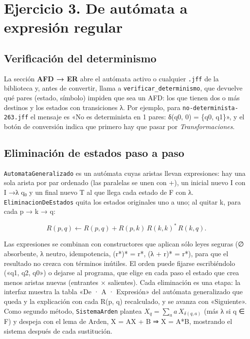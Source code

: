 \hypertarget{ejercicio-3.-de-autuxf3mata-a-expresiuxf3n-regular}{%
\section{Ejercicio 3. De autómata a expresión regular}\label{ejercicio-3.-de-autuxf3mata-a-expresiuxf3n-regular}}

\hypertarget{verificaciuxf3n-del-determinismo}{%
\subsection{Verificación del determinismo}\label{verificaciuxf3n-del-determinismo}}

La sección \textbf{AFD → ER} abre el autómata activo o cualquier \texttt{.jff} de la biblioteca y, antes de convertir, llama a \texttt{verificar\_determinismo}, que devuelve qué pares (estado, símbolo) impiden que sea un AFD: los que tienen dos o más destinos y los estados con transiciones λ. Por ejemplo, para \texttt{no-determinista-263.jff} el mensaje es «No es determinista en 1 pares: δ(q0, 0) = \{q0, q1\}», y el botón de conversión indica que primero hay que pasar por \emph{Transformaciones}.

\hypertarget{eliminaciuxf3n-de-estados-paso-a-paso}{%
\subsection{Eliminación de estados paso a paso}\label{eliminaciuxf3n-de-estados-paso-a-paso}}

\texttt{AutomataGeneralizado} es un autómata cuyas aristas llevan expresiones: hay una sola arista por par ordenado (las paralelas se unen con +), un inicial nuevo I con I →λ q₀ y un final nuevo T al que llega cada estado de F con λ. \texttt{EliminacionDeEstados} quita los estados originales uno a uno; al quitar k, para cada p → k → q:

\[R(p, q) \leftarrow R(p, q) + R(p, k)\,R(k, k)^*\,R(k, q).\]

Las expresiones se combinan con constructores que aplican sólo leyes seguras (∅ absorbente, λ neutro, idempotencia, (r*)* = r*, (λ + r)* = r*), para que el resultado no crezca con términos inútiles. El orden puede fijarse escribiéndolo («q1, q2, q0») o dejarse al programa, que elige en cada paso el estado que crea menos aristas nuevas (entrantes × salientes). Cada eliminación es una etapa: la interfaz muestra la tabla «De · A · Expresión» del autómata generalizado que queda y la explicación con cada R(p, q) recalculado, y se avanza con «Siguiente». Como segundo método, \texttt{SistemaArden} plantea \(X_q = \sum_a a\, X_{\delta(q,a)}\) (más λ si q ∈ F) y despeja con el lema de Arden, X = AX + B ⇒ X = A*B, mostrando el sistema después de cada sustitución.

